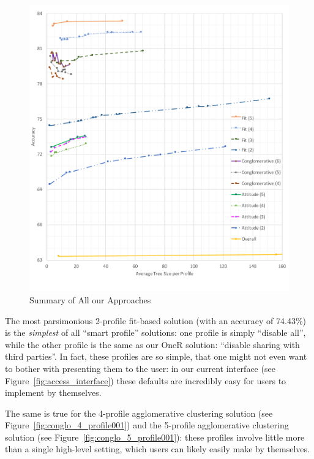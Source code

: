 \begin{figure}
	\centering
	\includegraphics[width=\textwidth]{figures/summaryAll.pdf}
	\caption{Summary of All our Approaches}
	\label{fig:summary}
\end{figure}

The most parsimonious 2-profile fit-based solution (with an accuracy of 74.43\%) is the \emph{simplest} of all ``smart profile'' solutions: one profile is simply ``disable all'', while the other profile is the same as our OneR solution: ``disable sharing with third parties''. In fact, these profiles are so simple, that one might not even want to bother with presenting them to the user: in our current interface (see Figure~\ref{fig:access_interface}) these defaults are incredibly easy for users to implement by themselves.

The same is true for the 4-profile agglomerative clustering solution (see Figure~\ref{fig:conglo_4_profile001}) and the 5-profile agglomerative clustering solution (see Figure~\ref{fig:conglo_5_profile001}): these profiles involve little more than a single high-level setting, which users can likely easily make by themselves. 

